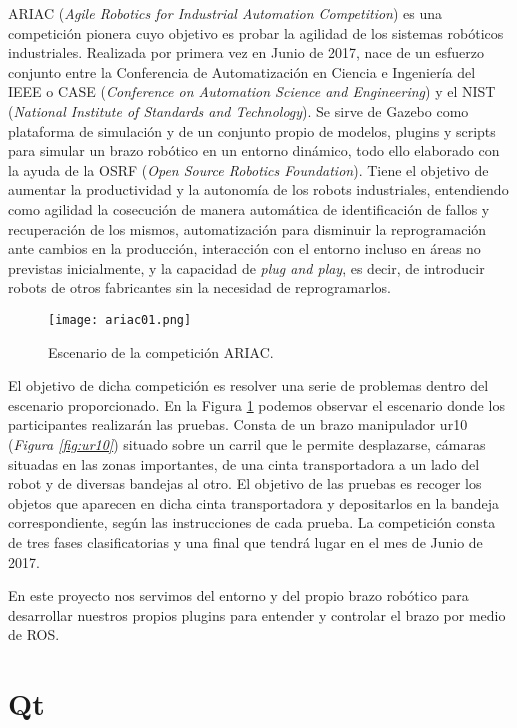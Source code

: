 ARIAC\cite{ariac} (\textit{Agile Robotics for Industrial Automation Competition}) es una competición pionera cuyo objetivo es probar la agilidad de los sistemas robóticos industriales. Realizada por primera vez en Junio de 2017, nace de un esfuerzo conjunto entre la Conferencia de Automatización en Ciencia e Ingeniería del IEEE o CASE (\textit{Conference on Automation Science and Engineering}) y el NIST (\textit{National Institute of Standards and Technology}). Se sirve de Gazebo como plataforma de simulación y de un conjunto propio de modelos, plugins y scripts para simular un brazo robótico en un entorno dinámico, todo ello elaborado con la ayuda de la OSRF (\textit{Open Source Robotics Foundation}). Tiene el objetivo de aumentar la productividad y la autonomía de los robots industriales, entendiendo como agilidad la cosecución de manera automática de identificación de fallos y recuperación de los mismos, automatización para disminuir la reprogramación ante cambios en la producción, interacción con el entorno incluso en áreas no previstas inicialmente, y la capacidad de \textit{plug and play}, es decir, de introducir robots de otros fabricantes sin la necesidad de reprogramarlos.

\begin{figure}[h]
	\centering\texttt{[image: ariac01.png]}
	\caption{Escenario de la competición ARIAC.}
	\label{fig:ariac01}
\end{figure}

El objetivo de dicha competición es resolver una serie de problemas dentro del escenario proporcionado. En la Figura \ref{fig:ariac01} podemos observar el escenario donde los participantes realizarán las pruebas. Consta de un brazo manipulador ur10 (\textit{Figura \ref{fig:ur10}}) situado sobre un carril que le permite desplazarse, cámaras situadas en las zonas importantes, de una cinta transportadora a un lado del robot y de diversas bandejas al otro. El objetivo de las pruebas es recoger los objetos que aparecen en dicha cinta transportadora y depositarlos en la bandeja correspondiente, según las instrucciones de cada prueba. La competición consta de tres fases clasificatorias y una final que tendrá lugar en el mes de Junio de 2017.

En este proyecto nos servimos del entorno y del propio brazo robótico para desarrollar nuestros propios plugins para entender y controlar el brazo por medio de ROS.


\section{Qt}
\label{sec:inf_qt}

